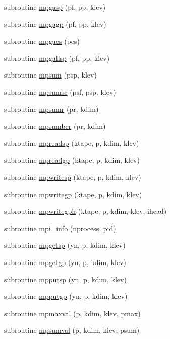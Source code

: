 \begin{DoxyCompactItemize}
subroutine \hyperlink{mpimod__multi_8f90_ac053a575b1230f8e4a296164dba5ab27}{mpgasp} (pf, pp, klev)
\item 
subroutine \hyperlink{mpimod__multi_8f90_aaa1210298789f4fd7b7702c276eb80a9}{mpgagp} (pf, pp, klev)
\item 
subroutine \hyperlink{mpimod__multi_8f90_a5aef7e33503e0c46b1d8c0b984c398d1}{mpgacs} (pcs)
\item 
subroutine \hyperlink{mpimod__multi_8f90_a54cf45feb57177de8eaab2e6b01a7aa2}{mpgallsp} (pf, pp, klev)
\item 
subroutine \hyperlink{mpimod__multi_8f90_af894efd9525c935f22415e017dcbc482}{mpsum} (psp, klev)
\item 
subroutine \hyperlink{mpimod__multi_8f90_a75a681a8d4b9ab5ba0d4fa97f909647b}{mpsumsc} (psf, psp, klev)
\item 
subroutine \hyperlink{mpimod__multi_8f90_af2111ef6d5b772479a74e94d351440f0}{mpsumr} (pr, kdim)
\item 
subroutine \hyperlink{mpimod__multi_8f90_ad703e6ecd123e9b8280322e402d57d20}{mpsumbcr} (pr, kdim)
\item 
subroutine \hyperlink{mpimod__multi_8f90_a4aceba15459fefd864a0ed3313b0073d}{mpreadsp} (ktape, p, kdim, klev)
\item 
subroutine \hyperlink{mpimod__multi_8f90_a463456bde27045e2cf286e6e6082b9aa}{mpreadgp} (ktape, p, kdim, klev)
\item 
subroutine \hyperlink{mpimod__multi_8f90_aca5ad2279542f783c1d862333da96744}{mpwritesp} (ktape, p, kdim, klev)
\item 
subroutine \hyperlink{mpimod__multi_8f90_a3e3ab4b6cd8d7863f7bfc0e74b370488}{mpwritegp} (ktape, p, kdim, klev)
\item 
subroutine \hyperlink{mpimod__multi_8f90_a325e1b8f8412b422a06fb7558f212f7e}{mpwritegph} (ktape, p, kdim, klev, ihead)
\item 
subroutine \hyperlink{mpimod__multi_8f90_acb4faf87d9aa8c0bfc86d75f261989c5}{mpi\-\_\-info} (nprocess, pid)
\item 
subroutine \hyperlink{mpimod__multi_8f90_acf82ae878fff75151cab59cdd0925ae0}{mpgetsp} (yn, p, kdim, klev)
\item 
subroutine \hyperlink{mpimod__multi_8f90_a58d54c2e0590e63a7459417831afe5cf}{mpgetgp} (yn, p, kdim, klev)
\item 
subroutine \hyperlink{mpimod__multi_8f90_a79c341b7b52bf44470898581072660b8}{mpputsp} (yn, p, kdim, klev)
\item 
subroutine \hyperlink{mpimod__multi_8f90_a7e675330db7b46cf0bf0cc8edd2d413c}{mpputgp} (yn, p, kdim, klev)
\item 
subroutine \hyperlink{mpimod__multi_8f90_a1b6ac2b98059a43359ac0edfeb9c2ad7}{mpmaxval} (p, kdim, klev, pmax)
\item 
subroutine \hyperlink{mpimod__multi_8f90_ac1dfb34daad89cf72ff04b6a58919b2b}{mpsumval} (p, kdim, klev, psum)
\end{DoxyCompactItemize}


